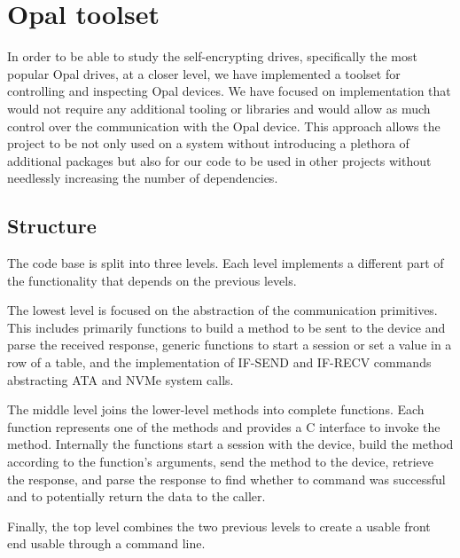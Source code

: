 

\chapter{Opal toolset}


In order to be able to study the self-encrypting drives, specifically the most popular Opal drives, at a closer level, we have implemented a toolset for controlling and inspecting Opal devices. 
We have focused on implementation that would not require any additional tooling or libraries and would allow as much control over the communication with the Opal device. This approach allows the project to be not only used on a system without introducing a plethora of additional packages but also for our code to be used in other projects without needlessly increasing the number of dependencies.

\section{Structure}

The code base is split into three levels. Each level implements a different part of the functionality that depends on the previous levels.

The lowest level is focused on the abstraction of the communication primitives. This includes primarily functions to build a method to be sent to the device and parse the received response, generic functions to start a session or set a value in a row of a table, and the implementation of IF-SEND and IF-RECV commands abstracting ATA and NVMe system calls.


The middle level joins the lower-level methods into complete functions. Each function represents one of the methods and provides a C interface to invoke the method. Internally the functions start a session with the device, build the method according to the function's arguments, send the method to the device, retrieve the response, and parse the response to find whether to command was successful and to potentially return the data to the caller.

Finally, the top level combines the two previous levels to create a usable front end usable through a command line.

